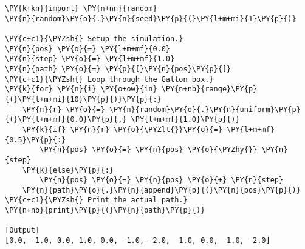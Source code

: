 \begin{Verbatim}[label=\makebox{\href{https://bitbucket.org/lbaldini/statnotes/src/master/snippets/galton\_box.py}{https://bitbucket.org/.../galton\_box.py}},commandchars=\\\{\}]
\PY{k+kn}{import} \PY{n+nn}{random}
\PY{n}{random}\PY{o}{.}\PY{n}{seed}\PY{p}{(}\PY{l+m+mi}{1}\PY{p}{)}

\PY{c+c1}{\PYZsh{} Setup the simulation.}
\PY{n}{pos} \PY{o}{=} \PY{l+m+mf}{0.0}
\PY{n}{step} \PY{o}{=} \PY{l+m+mf}{1.0}
\PY{n}{path} \PY{o}{=} \PY{p}{[}\PY{n}{pos}\PY{p}{]}
\PY{c+c1}{\PYZsh{} Loop through the Galton box.}
\PY{k}{for} \PY{n}{i} \PY{o+ow}{in} \PY{n+nb}{range}\PY{p}{(}\PY{l+m+mi}{10}\PY{p}{)}\PY{p}{:}
    \PY{n}{r} \PY{o}{=} \PY{n}{random}\PY{o}{.}\PY{n}{uniform}\PY{p}{(}\PY{l+m+mf}{0.0}\PY{p}{,} \PY{l+m+mf}{1.0}\PY{p}{)}
    \PY{k}{if} \PY{n}{r} \PY{o}{\PYZlt{}}\PY{o}{=} \PY{l+m+mf}{0.5}\PY{p}{:}
        \PY{n}{pos} \PY{o}{=} \PY{n}{pos} \PY{o}{\PYZhy{}} \PY{n}{step}
    \PY{k}{else}\PY{p}{:}
        \PY{n}{pos} \PY{o}{=} \PY{n}{pos} \PY{o}{+} \PY{n}{step}
    \PY{n}{path}\PY{o}{.}\PY{n}{append}\PY{p}{(}\PY{n}{pos}\PY{p}{)}
\PY{c+c1}{\PYZsh{} Print the actual path.}
\PY{n+nb}{print}\PY{p}{(}\PY{n}{path}\PY{p}{)}

[Output]
[0.0, -1.0, 0.0, 1.0, 0.0, -1.0, -2.0, -1.0, 0.0, -1.0, -2.0]
\end{Verbatim}